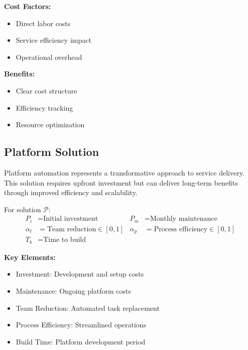 \documentclass[12pt,a4paper]{article}
\newenvironment{definition}[1]
{\begin{mdframed}[style=definitionstyle,frametitle={Definition: #1}]}
{\end{mdframed}}
\newenvironment{explanation}
{\begin{mdframed}[style=explanationstyle,frametitle={Explanation}]}
{\end{mdframed}}
\begin{document}
\begin{explanation}
\textbf{Cost Factors:}
\begin{itemize}
    \item Direct labor costs
    \item Service efficiency impact
    \item Operational overhead
\end{itemize}
\textbf{Benefits:}
\begin{itemize}
    \item Clear cost structure
    \item Efficiency tracking
    \item Resource optimization
\end{itemize}
\end{explanation}

\subsection{Platform Solution}
Platform automation represents a transformative approach to service delivery. This solution requires upfront investment but can deliver long-term benefits through improved efficiency and scalability.

\begin{definition}{Platform Variables}
For solution $\mathcal{P}$:
\begin{align*}
    P_i &= \text{Initial investment} & P_m &= \text{Monthly maintenance} \\
    \alpha_t &= \text{Team reduction} \in [0,1] & \alpha_p &= \text{Process efficiency} \in [0,1] \\
    T_b &= \text{Time to build} & &
\end{align*}
\end{definition}

\begin{explanation}
\textbf{Key Elements:}
\begin{itemize}
    \item Investment: Development and setup costs
    \item Maintenance: Ongoing platform costs
    \item Team Reduction: Automated task replacement
    \item Process Efficiency: Streamlined operations
    \item Build Time: Platform development period
\end{itemize}
\end{explanation}
\end{document}
